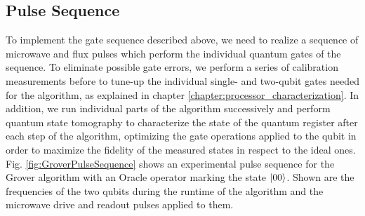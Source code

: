 \subsection{Pulse Sequence}

To implement the gate sequence described above, we need to realize a sequence of microwave and flux pulses which perform the individual quantum gates of the sequence. To eliminate possible gate errors, we perform a series of calibration measurements before to tune-up the individual single- and two-qubit gates needed for the algorithm, as explained in chapter \ref{chapter:processor_characterization}. In addition, we run individual parts of the algorithm successively and perform quantum state tomography to characterize the state of the quantum register after each step of the algorithm, optimizing the gate operations applied to the qubit in order to maximize the fidelity of the measured states in respect to the ideal ones. Fig. \ref{fig:GroverPulseSequence} shows an experimental pulse sequence for the Grover algorithm with an Oracle operator marking the state $\left| 00 \right>$. Shown are the frequencies of the two qubits during the runtime of the algorithm and the microwave drive and readout pulses applied to them.

